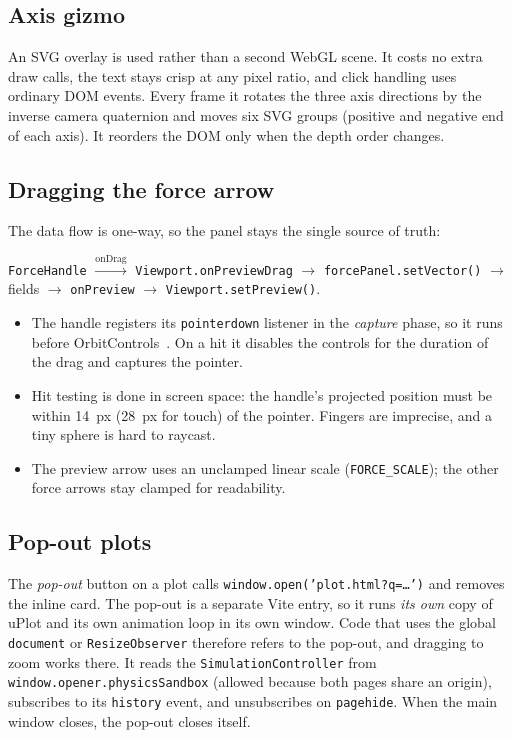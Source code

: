 \documentclass[11pt]{article}
\begin{document}
\subsection{Axis gizmo}
An SVG overlay is used rather than a second WebGL scene. It costs no extra draw calls, the text
stays crisp at any pixel ratio, and click handling uses ordinary DOM events. Every frame it rotates
the three axis directions by the inverse camera quaternion and moves six SVG groups (positive and
negative end of each axis). It reorders the DOM only when the depth order changes.

\subsection{Dragging the force arrow}
The data flow is one-way, so the panel stays the single source of truth:
\begin{center}
\texttt{ForceHandle} $\xrightarrow{\text{onDrag}}$ \texttt{Viewport.onPreviewDrag} $\to$
\texttt{forcePanel.setVector()} $\to$ fields $\to$ \texttt{onPreview} $\to$ \texttt{Viewport.setPreview()}.
\end{center}
\begin{itemize}
  \item The handle registers its \texttt{pointerdown} listener in the \emph{capture} phase, so it runs
        before OrbitControls~\cite{orbitcontrols}. On a hit it disables the controls for the duration
        of the drag and captures the pointer.
  \item Hit testing is done in screen space: the handle's projected position must be within
        \SI{14}{px} (\SI{28}{px} for touch) of the pointer. Fingers are imprecise, and a tiny
        sphere is hard to raycast.
  \item The preview arrow uses an unclamped linear scale (\texttt{FORCE\_SCALE}); the other
        force arrows stay clamped for readability.
\end{itemize}

\subsection{Pop-out plots}
The \emph{pop-out} button on a plot calls \texttt{window.open('plot.html?q=\ldots')} and removes the inline card.
The pop-out is a separate Vite entry, so it runs \emph{its own} copy of uPlot and its own animation
loop in its own window. Code that uses the global \texttt{document} or \texttt{ResizeObserver}
therefore refers to the pop-out, and dragging to zoom works there. It reads the
\texttt{SimulationController} from \texttt{window.opener.physicsSandbox} (allowed because both
pages share an origin), subscribes to its \texttt{history} event, and unsubscribes on
\texttt{pagehide}. When the main window closes, the pop-out closes itself.
\end{document}

